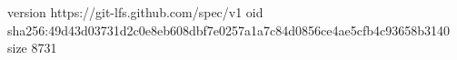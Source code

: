 version https://git-lfs.github.com/spec/v1
oid sha256:49d43d03731d2c0e8eb608dbf7e0257a1a7c84d0856ce4ae5cfb4c93658b3140
size 8731
